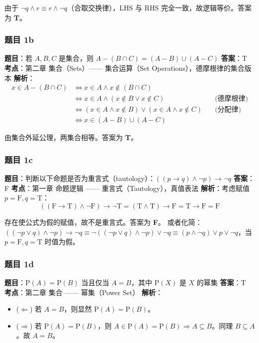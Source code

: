 \documentclass[10pt,a4paper,openany]{ctexbook}
\theoremstyle{definition}
\theoremstyle{remark}
\begin{document}
由于 $\neg q \land r \equiv r \land \neg q$（合取交换律），LHS 与 RHS 完全一致，故逻辑等价。答案为 \textbf{T}。
\vspace{-2pt}

\subsubsection{题目 1b}

\textbf{题目}：若 $A, B, C$ 是集合，则 $A - (B \cap C) = (A - B) \cup (A - C)$
\textbf{答案}：T
\textbf{考点}：第二章 集合（Sets）—— 集合运算（Set Operations），德摩根律的集合版本
\textbf{解析}：
\[
\begin{aligned}
x \in A - (B \cap C) &\iff x \in A \land x \notin (B \cap C) \\
&\iff x \in A \land (x \notin B \lor x \notin C) \quad &\text{(德摩根律)}\\
&\iff (x \in A \land x \notin B) \lor (x \in A \land x \notin C) \quad &\text{(分配律)}\\
&\iff x \in (A - B) \cup (A - C)
\end{aligned}
\]

由集合外延公理，两集合相等。答案为 \textbf{T}。
\vspace{-2pt}

\subsubsection{题目 1c}

\textbf{题目}：判断以下命题是否为重言式（tautology）：$((p \to q) \land \neg p) \to \neg q$
\textbf{答案}：F
\textbf{考点}：第一章 命题逻辑 —— 重言式（Tautology），真值表法
\textbf{解析}：考虑赋值 $p = \mathrm{F}, q = \mathrm{T}$：
\[
((\mathrm{F} \to \mathrm{T}) \land \neg\mathrm{F}) \to \neg\mathrm{T} = (\mathrm{T} \land \mathrm{T}) \to \mathrm{F} = \mathrm{T} \to \mathrm{F} = \mathrm{F}
\]

存在使公式为假的赋值，故不是重言式。答案为 \textbf{F}。
或者化简：$((\neg p \lor q) \land \neg p) \to \neg q \equiv \neg((\neg p \lor q) \land \neg p) \lor \neg q \equiv (p \land \neg q) \lor p \lor \neg q$，当 $p = \mathrm{F}, q = \mathrm{T}$ 时值为假。
\vspace{-2pt}

\subsubsection{题目 1d}

\textbf{题目}：$\mathrm{P}(A) = \mathrm{P}(B)$ 当且仅当 $A = B$，其中 $\mathrm{P}(X)$ 是 $X$ 的幂集
\textbf{答案}：T
\textbf{考点}：第二章 集合 —— 幂集（Power Set）
\textbf{解析}：
\begin{itemize}
\item ($\Leftarrow$) 若 $A = B$，则显然 $\mathrm{P}(A) = \mathrm{P}(B)$。
\item ($\Rightarrow$) 若 $\mathrm{P}(A) = \mathrm{P}(B)$，则 $A \in \mathrm{P}(A) = \mathrm{P}(B) \Rightarrow A \subseteq B$。同理 $B \subseteq A$。故 $A = B$。

\end{itemize}
\end{document}
